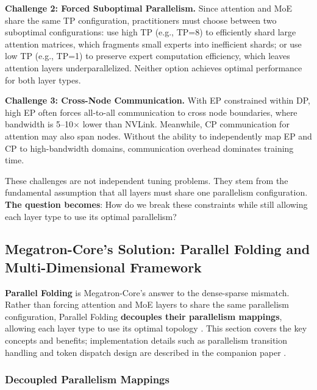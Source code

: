 \documentclass[10pt,logo,copyright]{nvidiatechreport}
\begin{document}
\textbf{Challenge 2: Forced Suboptimal Parallelism.} Since attention and MoE share the same TP configuration, practitioners must choose between two suboptimal configurations: use high TP (e.g., TP=8) to efficiently shard large attention matrices, which fragments small experts into inefficient shards; or use low TP (e.g., TP=1) to preserve expert computation efficiency, which leaves attention layers underparallelized. Neither option achieves optimal performance for both layer types.

\textbf{Challenge 3: Cross-Node Communication.} With EP constrained within DP, high EP often forces all-to-all communication to cross node boundaries, where bandwidth is 5--10$\times$ lower than NVLink. Meanwhile, CP communication for attention may also span nodes. Without the ability to independently map EP and CP to high-bandwidth domains, communication overhead dominates training time.

These challenges are not independent tuning problems. They stem from the fundamental assumption that all layers must share one parallelism configuration. \textbf{The question becomes}: How do we break these constraints while still allowing each layer type to use its optimal parallelism?

\subsection{Megatron-Core's Solution: Parallel Folding and Multi-Dimensional Framework}\label{sec:parallel-folding}

\textbf{Parallel Folding} is Megatron-Core's answer to the dense-sparse mismatch. Rather than forcing attention and MoE layers to share the same parallelism configuration, Parallel Folding \textbf{decouples their parallelism mappings}, allowing each layer type to use its optimal topology \cite{liu2025moeparallelfoldingheterogeneous}. This section covers the key concepts and benefits; implementation details such as parallelism transition handling and token dispatch design are described in the companion paper \cite{liu2025moeparallelfoldingheterogeneous}.

\subsubsection{Decoupled Parallelism Mappings}
\end{document}
